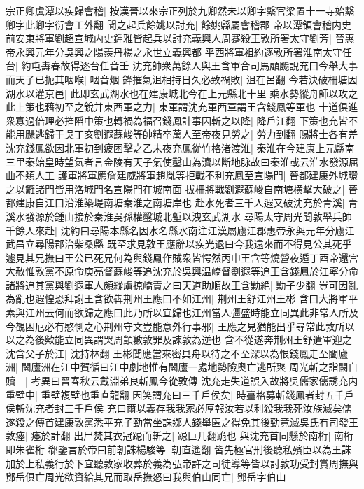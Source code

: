 宗正卿虞潭以疾歸會稽|{
	按漢晉以來宗正列於九卿然未以卿字繫官梁置十一寺始繫卿字此卿字衍會工外翻}
聞之起兵餘姚以討充|{
	餘姚縣屬會稽郡}
帝以潭領會稽内史前安東將軍劉超宣城内史鍾雅皆起兵以討充義興人周蹇殺王敦所署太守劉芳|{
	晉惠帝永興元年分吳興之陽羨丹楊之永世立義興都}
平西將軍祖約逐敦所署淮南太守任台|{
	約屯夀春故得逐台任音壬}
沈充帥衆萬餘人與王含軍合司馬顧颺說充曰今舉大事而天子已扼其咽喉|{
	咽音烟}
鋒摧氣沮相持日久必致禍敗|{
	沮在呂翻}
今若決破柵塘因湖水以灌京邑|{
	此即玄武湖水也在建康城北今在上元縣北十里}
乘水勢縱舟師以攻之此上策也藉初至之銳并東西軍之力|{
	東軍謂沈充軍西軍謂王含錢鳳等軍也}
十道俱進衆寡過倍理必摧䧟中策也轉禍為福召錢鳳計事因斬之以降|{
	降戶江翻}
下策也充皆不能用颺逃歸于吳丁亥劉遐蘇峻等帥精卒萬人至帝夜見勞之|{
	勞力到翻}
賜將士各有差沈充錢鳳欲因北軍初到疲困擊之乙未夜充鳳從竹格渚渡淮|{
	秦淮在今建康上元縣南三里秦始皇時望氣者言金陵有天子氣使鑿山為瀆以斷地脉故曰秦淮或云淮水發源屈曲不類人工}
護軍將軍應詹建威將軍趙胤等拒戰不利充鳳至宣陽門|{
	晉都建康外城環之以籬諸門皆用洛城門名宣陽門在城南面}
拔柵將戰劉遐蘇峻自南塘横擊大破之|{
	晉都建康自江口沿淮築堤南塘秦淮之南塘岸也}
赴水死者三千人遐又破沈充於青溪|{
	青溪水發源於鍾山接於秦淮吳孫權鑿城北塹以洩玄武湖水}
尋陽太守周光聞敦舉兵帥千餘人來赴|{
	沈約曰尋陽本縣名因水名縣水南注江漢屬廬江郡惠帝永興元年分廬江武昌立尋陽郡治柴桑縣}
既至求見敦王應辭以疾光退曰今我遠來而不得見公其死乎遽見其兄撫曰王公已死兄何為與錢鳳作賊衆皆愕然丙申王含等燒營夜遁丁酉帝還宫大赦惟敦黨不原命庾亮督蘇峻等追沈充於吳興温嶠督劉遐等追王含錢鳳於江寜分命諸將追其黨與劉遐軍人頗縱虜掠嶠責之曰天道助順故王含勦絶|{
	勦子少翻}
豈可因亂為亂也遐惶恐拜謝王含欲犇荆州王應曰不如江州|{
	荆州王舒江州王彬}
含曰大將軍平素與江州云何而欲歸之應曰此乃所以宜歸也江州當人彊盛時能立同異此非常人所及今覩困厄必有愍惻之心荆州守文豈能意外行事邪|{
	王應之見猶能出乎尋常此敦所以以之為後歟能立同異謂哭周顗數敦罪及諫敦為逆也}
含不從遂奔荆州王舒遣軍迎之沈含父子於江|{
	沈持林翻}
王彬聞應當來密具舟以待之不至深以為恨錢鳳走至闔廬洲|{
	闔廬洲在江中賀循曰江中劇地惟有闔廬一處地勢險奥亡逃所聚}
周光斬之詣闕自贖　|{
	考異曰晉春秋云戴淵弟良斬鳳今從敦傳}
沈充走失道誤入故將吳儒家儒誘充内重壁中|{
	重壁複壁也重直龍翻}
因笑謂充曰三千戶侯矣|{
	時臺格募斬錢鳳者封五千戶侯斬沈充者封三千戶侯}
充曰爾以義存我我家必厚報汝若以利殺我我死汝族滅矣儒遂殺之傳首建康敦黨悉平充子勁當坐誅鄉人錢舉匿之得免其後勁竟滅吳氏有司發王敦瘞|{
	瘞於計翻}
出尸焚其衣冠跽而斬之|{
	跽巨几翻跪也}
與沈充首同懸於南桁|{
	南桁即朱雀桁}
郗鑒言於帝曰前朝誅楊駿等|{
	朝直遙翻}
皆先極官刑後聽私殯臣以為王誅加於上私義行於下宜聽敦家收葬於義為弘帝許之司徒導等皆以討敦功受封賞周撫與鄧岳俱亡周光欲資給其兄而取岳撫怒曰我與伯山同亡|{
	鄧岳字伯山}
